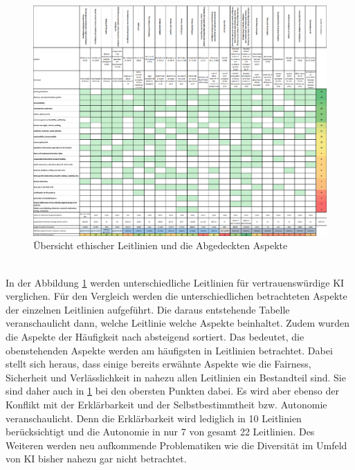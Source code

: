 \begin{onehalfspace}
        \begin{figure}[h]
            \centering
            \includegraphics[width = \textwidth]{Bilder/Ethical huidelines hagendorf 2020.png}
            \caption{Übersicht ethischer Leitlinien und die Abgedeckten Aspekte \cite{Hagendorff2020}}
            \label{fig:EthikGuidelines}
        \end{figure} \\
        In der Abbildung \ref*{fig:EthikGuidelines} werden unterschiedliche Leitlinien für vertrauenswürdige \ac*{KI} verglichen. Für den Vergleich werden die unterschiedlichen betrachteten Aspekte der einzelnen Leitlinien aufgeführt. Die daraus entstehende Tabelle veranschaulicht dann, welche Leitlinie welche Aspekte beinhaltet. Zudem wurden die Aspekte der Häufigkeit nach absteigend sortiert. Das bedeutet, die obenstehenden Aspekte werden am häufigsten in Leitlinien betrachtet. Dabei stellt sich heraus, dass einige bereits erwähnte Aspekte wie die Fairness, Sicherheit und Verlässlichkeit in nahezu allen Leitlinien ein Bestandteil sind. Sie sind daher auch in \ref*{fig:EthikGuidelines} bei den obersten Punkten dabei. Es wird aber ebenso der Konflikt mit der Erklärbarkeit und der Selbstbestimmtheit bzw. Autonomie veranschaulicht. Denn die Erklärbarkeit wird lediglich in 10 Leitlinien berücksichtigt und die Autonomie in nur 7 von gesamt 22 Leitlinien. Des Weiteren werden neu aufkommende Problematiken wie die Diversität im Umfeld von \ac*{KI} bisher nahezu gar nicht betrachtet.\cite{Hagendorff2020}\cite{jobin2019global} 
        \\

\end{onehalfspace}
